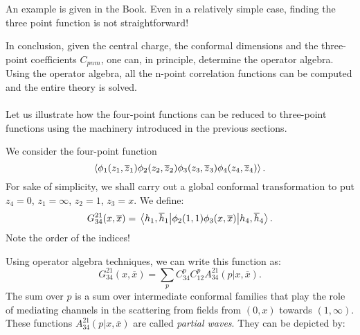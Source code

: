 \documentclass[submission, PhysLectNotes]{SciPost}
\begin{document}
An example is given in the Book. Even in a relatively simple case, finding the three point function is not straightforward!

In conclusion, given the central charge, the conformal dimensions and the three-point coefficients $C_{pnm}$, one can, in principle, determine the operator algebra. Using the operator algebra, all the n-point correlation functions can be computed and the entire theory is solved. \\

 \\
Let us illustrate how the four-point functions can be reduced to three-point functions using the machinery introduced in the previous sections.

We consider the four-point function
\begin{equation}
	\expval{\phi_1(z_1,\overline{z}_1)\phi_2(z_2,\overline{z}_2)\phi_3(z_3,\overline{z}_3)\phi_4(z_4,\overline{z}_4)}.
\end{equation}
For sake of simplicity, we shall carry out a global conformal transformation to put $z_4 = 0$, $z_1 = \infty$, $z_2 = 1$, $z_3 = x$.
We define:
\begin{equation}
	G_{34}^{21}(x,\overline{x}) = \mel{h_1,\overline{h}_1}{\phi_2(1,1)\phi_3(x,\overline{x})}{h_4,\overline{h}_4}.
\end{equation}
Note the order of the indices!

Using operator algebra techniques, we can write this function as:
\begin{equation}
	G_{34}^{21}(x,\overline{x}) = \sum_p C_{34}^p C_{12}^p A_{34}^{21}(p|x,\overline{x}).
\end{equation}
The sum over $p$ is a sum over intermediate conformal families that play the role of mediating channels in the scattering from fields from $(0,x)$ towards $(1,\infty)$. These functions $A_{34}^{21}(p|x,\overline{x})$ are called \emph{partial waves}. They can be depicted by:
\begin{figure}[htb]
\centering
{}
\end{figure}
\end{document}
